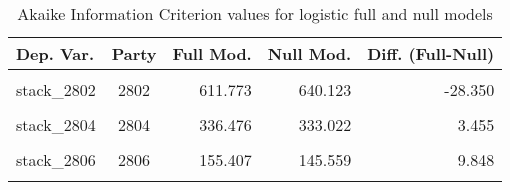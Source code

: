 \documentclass[
]{article}
\begin{document}
\begin{table}[!h]

\caption{\label{tab:unnamed-chunk-182}Akaike Information Criterion values for logistic full and null models 
        \label{table:logit_aic_uk}}
\centering
\begin{tabular}[t]{lcrrr}
\toprule
Dep. Var. & Party & Full Mod. & Null Mod. & Diff. (Full-Null)\\
\midrule
\cellcolor{gray!6}{stack\_2801} & \cellcolor{gray!6}{2801} & \cellcolor{gray!6}{463.434} & \cellcolor{gray!6}{475.051} & \cellcolor{gray!6}{-11.617}\\
stack\_2802 & 2802 & 611.773 & 640.123 & -28.350\\
\cellcolor{gray!6}{stack\_2803} & \cellcolor{gray!6}{2803} & \cellcolor{gray!6}{682.822} & \cellcolor{gray!6}{690.427} & \cellcolor{gray!6}{-7.605}\\
stack\_2804 & 2804 & 336.476 & 333.022 & 3.455\\
\cellcolor{gray!6}{stack\_2805} & \cellcolor{gray!6}{2805} & \cellcolor{gray!6}{223.256} & \cellcolor{gray!6}{214.772} & \cellcolor{gray!6}{8.485}\\
\addlinespace
stack\_2806 & 2806 & 155.407 & 145.559 & 9.848\\
\cellcolor{gray!6}{stack\_2807} & \cellcolor{gray!6}{2807} & \cellcolor{gray!6}{828.182} & \cellcolor{gray!6}{877.704} & \cellcolor{gray!6}{-49.522}\\
\bottomrule
\end{tabular}
\end{table}
\end{document}
